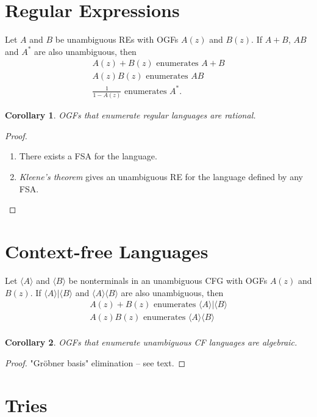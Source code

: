 \documentclass{article}
\newtheorem{corollary}{Corollary}
\begin{document}
\section{Regular Expressions}

Let $A$ and $B$ be unambiguous REs with OGFs $A(z)$ and $B(z)$. If $A + B$,
$AB$ and $A^*$ are also unambiguous, then
\begin{gather*}
  A(z) + B(z) \text{ enumerates } A + B \\
  A(z)B(z) \text{ enumerates } AB \\
  \frac{1}{1 - A(z)} \text{ enumerates } A^*.
\end{gather*}

\begin{corollary}
  OGFs that enumerate regular languages are rational.
\end{corollary}
\begin{proof}
  \begin{enumerate}
    \item There exists a FSA for the language.
    \item \emph{Kleene's theorem} gives an unambiguous RE for the language
      defined by any FSA.
  \end{enumerate}
\end{proof}

\section{Context-free Languages}

Let $\langle A \rangle$ and $\langle B \rangle$ be nonterminals in an
unambiguous CFG with OGFs $A(z)$ and $B(z)$. If $\langle A \rangle | \langle B
\rangle$ and $\langle A \rangle \langle B \rangle$ are also unambiguous, then
\begin{gather*}
  A(z) + B(z) \text{ enumerates } \langle A \rangle | \langle B \rangle \\
  A(z)B(z) \text{ enumerates } \langle A \rangle \langle B \rangle \\
\end{gather*}

\begin{corollary}
  OGFs that enumerate unambiguous CF languages are algebraic.
\end{corollary}
\begin{proof}
  "Gr\"{o}bner basis" elimination -- see text.
\end{proof}

\section{Tries}
\end{document}
